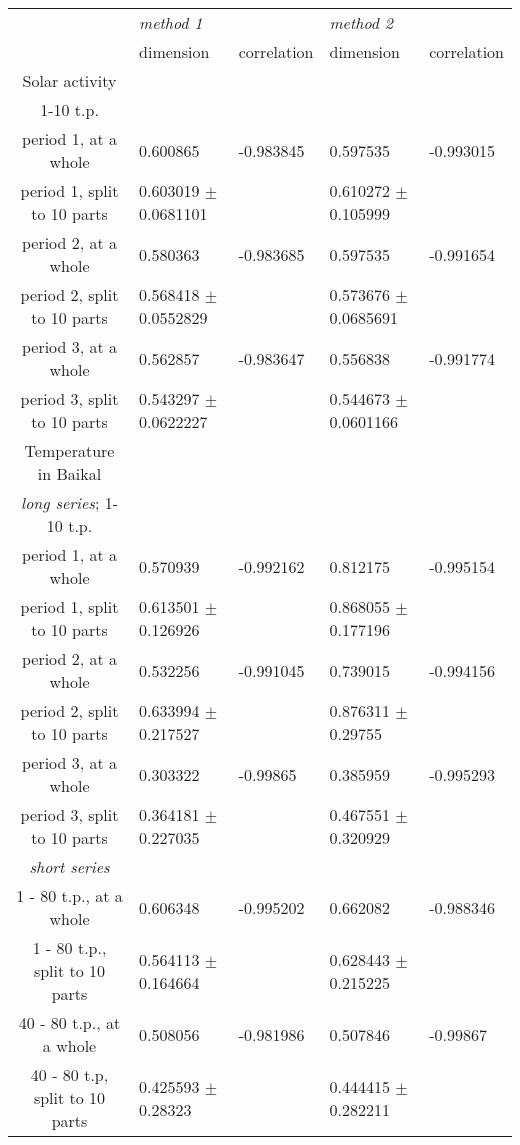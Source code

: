 \documentclass[a4paper]{article}
\begin{document}
\begin{tabular}{cllll}
\hline
                               & \textit{method 1}        &             & \textit{method 2}        &             \\
                               & dimension                & correlation & dimension                & correlation \\
\hline 
Solar activity\\
1-10 t.p.\\
period 1, at a whole           & 0.600865                 & -0.983845   & 0.597535                 & -0.993015   \\
period 1, split to 10 parts    & 0.603019 $\pm$ 0.0681101 &             & 0.610272 $\pm$ 0.105999  &             \\
period 2, at a whole           & 0.580363                 & -0.983685   & 0.597535                 & -0.991654   \\
period 2, split to 10 parts    & 0.568418 $\pm$ 0.0552829 &             & 0.573676 $\pm$ 0.0685691 &             \\
period 3, at a whole           & 0.562857                 & -0.983647   & 0.556838                 & -0.991774   \\
period 3, split to 10 parts    & 0.543297 $\pm$ 0.0622227 &             & 0.544673 $\pm$ 0.0601166 &             \\
\hline
Temperature in Baikal\\
\textit{long series}; 1-10 t.p.\\
period 1, at a whole           & 0.570939                 & -0.992162   & 0.812175                 & -0.995154   \\
period 1, split to 10 parts    & 0.613501 $\pm$ 0.126926  &             & 0.868055 $\pm$ 0.177196  &             \\
period 2, at a whole           & 0.532256                 & -0.991045   & 0.739015                 & -0.994156   \\
period 2, split to 10 parts    & 0.633994 $\pm$ 0.217527  &             & 0.876311 $\pm$ 0.29755   &             \\
period 3, at a whole           & 0.303322                 & -0.99865    & 0.385959                 & -0.995293   \\
period 3, split to 10 parts    & 0.364181 $\pm$ 0.227035  &             & 0.467551 $\pm$ 0.320929  &             \\
\textit{short series}\\
1 - 80 t.p., at a whole        & 0.606348                 & -0.995202   & 0.662082                 & -0.988346   \\
1 - 80 t.p., split to 10 parts & 0.564113 $\pm$ 0.164664  &             & 0.628443 $\pm$ 0.215225  &             \\
40 - 80 t.p., at a whole       & 0.508056                 & -0.981986   & 0.507846                 & -0.99867   \\
40 - 80 t.p, split to 10 parts & 0.425593 $\pm$ 0.28323   &             & 0.444415 $\pm$ 0.282211  &             \\
\hline
\end{tabular}
\end{document}
